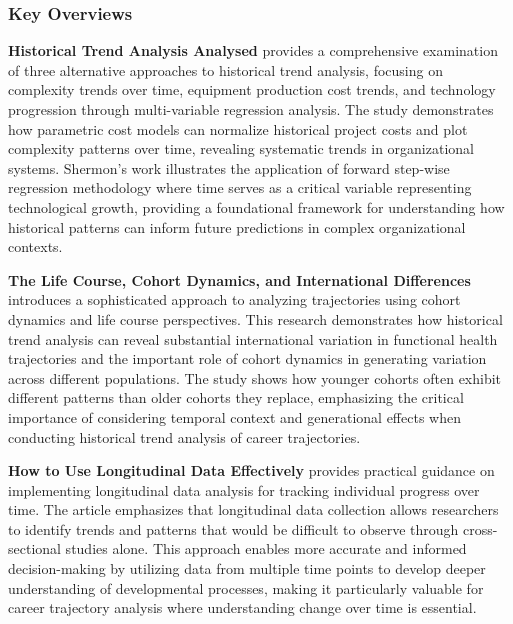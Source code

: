 \documentclass[../main.tex]{subfiles}
\begin{document}
\subsubsection{Key Overviews}


\textbf{Historical Trend Analysis Analysed} \citep{shermon2011} provides a comprehensive examination of three alternative approaches to historical trend analysis, focusing on complexity trends over time, equipment production cost trends, and technology progression through multi-variable regression analysis. The study demonstrates how parametric cost models can normalize historical project costs and plot complexity patterns over time, revealing systematic trends in organizational systems. Shermon's work illustrates the application of forward step-wise regression methodology where time serves as a critical variable representing technological growth, providing a foundational framework for understanding how historical patterns can inform future predictions in complex organizational contexts.


\textbf{The Life Course, Cohort Dynamics, and International Differences} \citep{haas2006} introduces a sophisticated approach to analyzing trajectories using cohort dynamics and life course perspectives. This research demonstrates how historical trend analysis can reveal substantial international variation in functional health trajectories and the important role of cohort dynamics in generating variation across different populations. The study shows how younger cohorts often exhibit different patterns than older cohorts they replace, emphasizing the critical importance of considering temporal context and generational effects when conducting historical trend analysis of career trajectories.


\textbf{How to Use Longitudinal Data Effectively} \citep{shamrck2023} provides practical guidance on implementing longitudinal data analysis for tracking individual progress over time. The article emphasizes that longitudinal data collection allows researchers to identify trends and patterns that would be difficult to observe through cross-sectional studies alone. This approach enables more accurate and informed decision-making by utilizing data from multiple time points to develop deeper understanding of developmental processes, making it particularly valuable for career trajectory analysis where understanding change over time is essential.
\end{document}
